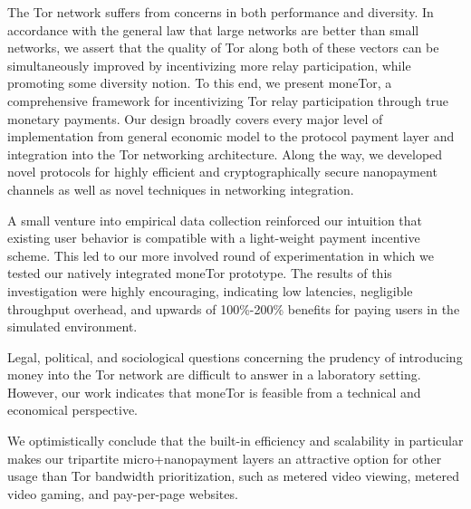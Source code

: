 The Tor network suffers from concerns in both performance and diversity. In
accordance with the general law that large networks are better than small
networks, we assert that the quality of Tor along both of these vectors can be
simultaneously improved by incentivizing more relay participation, while
promoting some diversity notion. To this end, we present moneTor, a
comprehensive framework for incentivizing Tor relay participation through true
monetary payments. Our design broadly covers every major level of implementation
from general economic model to the protocol payment layer and integration into
the Tor networking architecture. Along the way, we developed novel protocols for
highly efficient and cryptographically secure nanopayment channels as well as
novel techniques in networking integration.

A small venture into empirical data collection reinforced our intuition that
existing user behavior is compatible with a light-weight payment incentive
scheme. This led to our more involved round of experimentation in which we
tested our natively integrated moneTor prototype. The results of this
investigation were highly encouraging, indicating low latencies, negligible
throughput overhead, and upwards of 100\%-200\% benefits for paying users in the
simulated environment.

Legal, political, and sociological questions concerning the prudency of
introducing money into the Tor network are difficult to answer in a laboratory
setting. However, our work indicates that moneTor is feasible from a
technical and economical perspective.

We optimistically conclude that the built-in efficiency and scalability in particular makes our tripartite micro+nanopayment layers an attractive option for other usage than Tor bandwidth prioritization, such as metered video viewing, metered video gaming, and pay-per-page websites.
